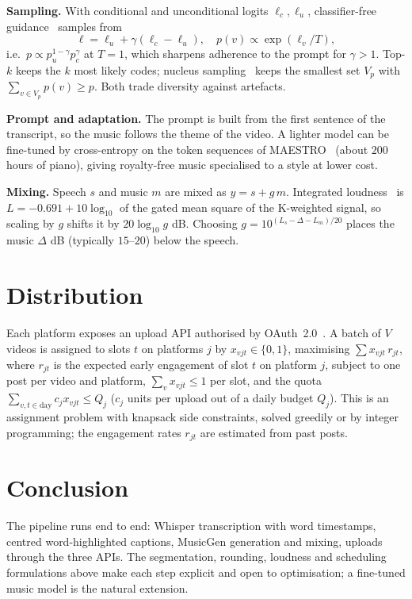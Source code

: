 \documentclass[10pt,twocolumn]{article}
\begin{document}
\textbf{Sampling.} With conditional and unconditional logits $\ell_c,\ell_u$, classifier-free guidance~\cite{ho2022} samples from
\begin{equation}
\ell=\ell_u+\gamma(\ell_c-\ell_u),\quad p(v)\propto\exp(\ell_v/T),
\end{equation}
i.e.\ $p\propto p_u^{1-\gamma}p_c^{\gamma}$ at $T=1$, which sharpens adherence to the prompt for $\gamma>1$. Top-$k$ keeps the $k$ most likely codes; nucleus sampling~\cite{holtzman2020} keeps the smallest set $V_p$ with $\sum_{v\in V_p}p(v)\ge p$. Both trade diversity against artefacts.

\textbf{Prompt and adaptation.} The prompt is built from the first sentence of the transcript, so the music follows the theme of the video. A lighter model can be fine-tuned by cross-entropy on the token sequences of MAESTRO~\cite{hawthorne2019} (about $200$ hours of piano), giving royalty-free music specialised to a style at lower cost.

\textbf{Mixing.} Speech $s$ and music $m$ are mixed as $y=s+g\,m$. Integrated loudness~\cite{itu1770} is $L=-0.691+10\log_{10}$ of the gated mean square of the K-weighted signal, so scaling by $g$ shifts it by $20\log_{10}g$ dB. Choosing $g=10^{(L_s-\Delta-L_m)/20}$ places the music $\Delta$ dB (typically $15$--$20$) below the speech.

\section{Distribution}
Each platform exposes an upload API authorised by OAuth~2.0~\cite{rfc6749}. A batch of $V$ videos is assigned to slots $t$ on platforms $j$ by $x_{vjt}\in\{0,1\}$, maximising $\sum x_{vjt}\,r_{jt}$, where $r_{jt}$ is the expected early engagement of slot $t$ on platform $j$, subject to one post per video and platform, $\sum_{v}x_{vjt}\le1$ per slot, and the quota $\sum_{v,t\in\text{day}}c_jx_{vjt}\le Q_j$ ($c_j$ units per upload out of a daily budget $Q_j$). This is an assignment problem with knapsack side constraints, solved greedily or by integer programming; the engagement rates $r_{jt}$ are estimated from past posts.

\section{Conclusion}
The pipeline runs end to end: Whisper transcription with word timestamps, centred word-highlighted captions, MusicGen generation and mixing, uploads through the three APIs. The segmentation, rounding, loudness and scheduling formulations above make each step explicit and open to optimisation; a fine-tuned music model is the natural extension.
\end{document}
